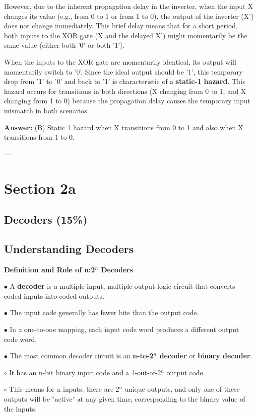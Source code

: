 \documentclass{article}
\begin{document}
\begin{itemize}
However, due to the inherent propagation delay in the inverter, when the input X changes its value (e.g., from 0 to 1 or from 1 to 0), the output of the inverter (X') does not change immediately. This brief delay means that for a short period, both inputs to the XOR gate (X and the delayed X') might momentarily be the same value (either both '0' or both '1').

When the inputs to the XOR gate are momentarily identical, its output will momentarily switch to '0'. Since the ideal output should be '1', this temporary drop from '1' to '0' and back to '1' is characteristic of a \textbf{static-1 hazard}. This hazard occurs for transitions in both directions (X changing from 0 to 1, and X changing from 1 to 0) because the propagation delay causes the temporary input mismatch in both scenarios.

\textbf{Answer:} (B) Static 1 hazard when X transitions from 0 to 1 and also when X transitions from 1 to 0.

---

\section{Section 2a}

\subsection{Decoders (15\%)}

\subsection{Understanding Decoders}

\textbf{Definition and Role of n:2$^{n}$ Decoders}

$\bullet$ A \textbf{decoder} is a multiple-input, multiple-output logic circuit that converts coded inputs into coded outputs.

$\bullet$ The input code generally has fewer bits than the output code.

$\bullet$ In a one-to-one mapping, each input code word produces a different output code word.

$\bullet$ The most common decoder circuit is an \textbf{n-to-2$^{n}$ decoder} or \textbf{binary decoder}.

    $\circ$ It has an n-bit binary input code and a 1-out-of-2$^{n}$ output code.

    $\circ$ This means for n inputs, there are 2$^{n}$ unique outputs, and only one of these outputs will be "active" at any given time, corresponding to the binary value of the inputs.


\end{itemize}
\end{document}
